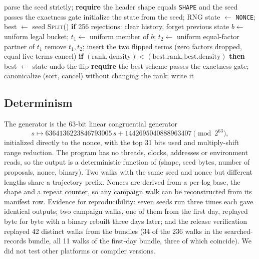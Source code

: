 \begin{algorithm}[t]
\caption{One directed walk (\texttt{wide\_rect\_walk SHAPE SEED OUT STEPS NONCE}).}\label{alg:walk}
\begin{algorithmic}[1]
\State parse the seed strictly; \textbf{require} the header shape equals \texttt{SHAPE} and the seed passes the exactness gate
\State initialize the state from the seed; RNG state $\gets$ \texttt{NONCE}; best $\gets$ seed
    \State \textsc{Split}() 
    \State \textbf{if} 256 rejections: clear history, forget previous state
  \EndIf
  \State $b\gets$ uniform legal bucket; $t_1\gets$ uniform member of $b$; $t_2\gets$ uniform equal-factor partner of $t_1$
  \State remove $t_1,t_2$; insert the two flipped terms (zero factors dropped, equal live terms cancel)
  \State \textbf{if} $(\mathrm{rank},\mathrm{density})<(\mathrm{best.rank},\mathrm{best.density})$ \textbf{then} best $\gets$ state
    \State undo the flip 
  \EndIf
\EndFor
\State \textbf{require} the best scheme passes the exactness gate; canonicalize (sort, cancel) without changing the rank; write it
\end{algorithmic}
\end{algorithm}

\subsection{Determinism}
The generator is the 63-bit linear congruential generator
\[ s\mapsto 6364136223846793005\,s+1442695040888963407 \pmod{2^{63}}, \]
initialized directly to the nonce, with the top 31 bits used and multiply-shift range reduction. The program has no threads, clocks, addresses or environment reads, so the output is a deterministic
function of (shape, seed bytes, number of proposals, nonce, binary). Two walks with the same seed and nonce but different lengths share a trajectory prefix.
Nonces are derived from a per-log base, the shape and a repeat counter, so any campaign walk can be reconstructed from its manifest row.
Evidence for reproducibility: seven seeds run three times each gave identical outputs; two campaign walks, one of them from the first day, replayed byte for byte
with a binary rebuilt three days later; and the release verification replayed 42 distinct walks from the bundles (34 of the 236 walks in the searched-records bundle, all 11 walks of the
first-day bundle, three of which coincide). We did not test other platforms or compiler versions.

